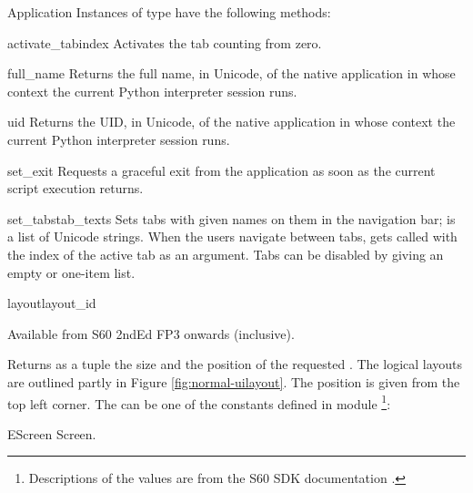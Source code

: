 \begin{classdesc*}{Application}
Instances of  type have the following methods:

\begin{methoddesc}[Application]{activate_tab}{index}
Activates the tab  counting from zero.
\end{methoddesc}

\begin{methoddesc}[Application]{full_name}{}
Returns the full name, in Unicode, of the native application in whose 
context the current Python interpreter session runs.
\end{methoddesc}

\begin{methoddesc}[Application]{uid}{}
Returns the UID, in Unicode, of the native application in whose 
context the current Python interpreter session runs.
\end{methoddesc}

\begin{methoddesc}[Application]{set_exit}{}
Requests a graceful exit from the application as soon as the current script 
execution returns.
\end{methoddesc}

\begin{methoddesc}[Application]{set_tabs}{tab_texts}
Sets tabs with given names on them in the navigation bar; 
 is a list of Unicode strings. When the users 
navigate between tabs,  gets called with the index 
of the active tab as an argument. Tabs can be disabled by giving an empty or 
one-item  list.
\end{methoddesc}


\begin{methoddesc}[Application]{layout}{layout_id}

\begin{notice}[note]
Available from S60 2ndEd FP3 onwards (inclusive).
\end{notice}

Returns as a tuple the size and the position of the requested . 
The logical layouts are outlined partly in Figure \ref{fig:normal-uilayout}. The 
position is given from the top left corner. The  can be one of 
the constants defined in module \footnote{Descriptions of the 
values are from the S60 SDK documentation \cite{S60Doc}.}:

\begin{datadesc}{EScreen} 
Screen.  
\end{datadesc}


\end{methoddesc}
\end{classdesc*}
